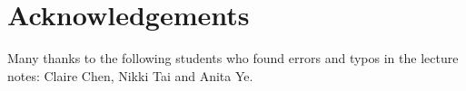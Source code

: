 \chapter*{Acknowledgements}%
\label{cha:acknowledgements}

Many thanks to the following students who found errors and typos in the lecture notes:
Claire Chen, Nikki Tai and Anita Ye.
